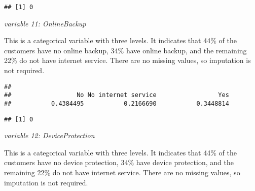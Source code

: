 \documentclass[
  a4paper]{article}
\newenvironment{Shaded}{\begin{snugshade}}{\end{snugshade}}
\newcommand{\CommentTok}[1]{\textcolor[rgb]{0.56,0.35,0.01}{\textit{#1}}}
\newcommand{\FunctionTok}[1]{\textcolor[rgb]{0.13,0.29,0.53}{\textbf{#1}}}
\newcommand{\NormalTok}[1]{#1}
\newcommand{\SpecialCharTok}[1]{\textcolor[rgb]{0.81,0.36,0.00}{\textbf{#1}}}
\begin{document}
\begin{Shaded}
\end{Shaded}

\begin{verbatim}
## [1] 0
\end{verbatim}

\emph{variable 11: OnlineBackup}

This is a categorical variable with three levels. It indicates that 44\%
of the customers have no online backup, 34\% have online backup, and the
remaining 22\% do not have internet service. There are no missing
values, so imputation is not required.

\begin{Shaded}
\end{Shaded}

\begin{verbatim}
## 
##                  No No internet service                 Yes 
##           0.4384495           0.2166690           0.3448814
\end{verbatim}

\begin{Shaded}
\end{Shaded}

\begin{verbatim}
## [1] 0
\end{verbatim}

\emph{variable 12: DeviceProtection}

This is a categorical variable with three levels. It indicates that 44\%
of the customers have no device protection, 34\% have device protection,
and the remaining 22\% do not have internet service. There are no
missing values, so imputation is not required.
\end{document}
